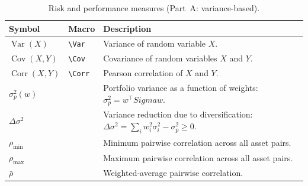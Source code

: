 \documentclass[12pt,openany]{book}
\newcommand{\bfw}{\mathbf{w}}
\newcommand{\bfSigma}{\boldsymbol{\Sigma}}
\DeclareMathOperator{\Var}{Var}
\DeclareMathOperator{\Cov}{Cov}
\DeclareMathOperator{\Corr}{Corr}
\numberwithin{equation}{chapter}
\theoremstyle{plain}
\theoremstyle{definition}
\theoremstyle{remark}
\renewcommand{\arraystretch}{1.2}
\def\bfw{w}%
\def\bfSigma{Sigma}%
\begin{document}
\begin{table}[H]
\renewcommand{\arraystretch}{1.35}
\caption{Risk and performance measures (Part~A: variance-based).}
\label{tab:symbols-risk-A}
\begin{tabularx}{\linewidth}{@{} l l X @{}}
\toprule
\textbf{Symbol} & \textbf{Macro} & \textbf{Description} \\
\midrule
$\Var(X)$ & \texttt{\textbackslash Var} &
  Variance of random variable $X$. \\
$\Cov(X,Y)$ & \texttt{\textbackslash Cov} &
  Covariance of random variables $X$ and $Y$. \\
$\Corr(X,Y)$ & \texttt{\textbackslash Corr} &
  Pearson correlation of $X$ and $Y$. \\
$\sigma_p^2(\bfw)$ & &
  Portfolio variance as a function of weights:
  $\sigma_p^2 = \bfw^\top\bfSigma\bfw$. \\
$\Delta\sigma^2$ & &
  Variance reduction due to diversification:
  $\Delta\sigma^2 = \sum_i w_i^2\sigma_i^2 - \sigma_p^2 \geq 0$. \\
$\rho_{\min}$ & &
  Minimum pairwise correlation across all asset pairs. \\
$\rho_{\max}$ & &
  Maximum pairwise correlation across all asset pairs. \\
$\bar\rho$ & &
  Weighted-average pairwise correlation. \\
\bottomrule
\end{tabularx}
\end{table}
\end{document}
